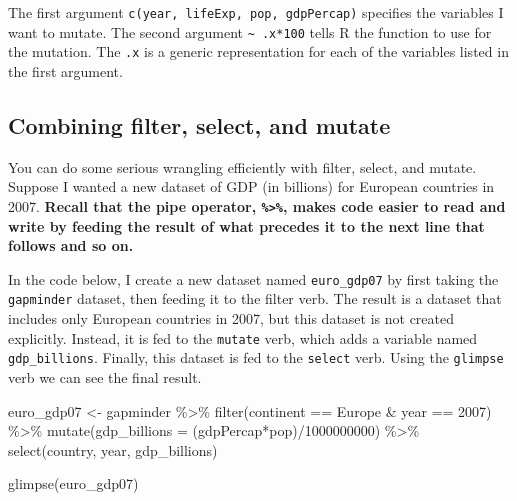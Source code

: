 \documentclass[
]{book}
\makeatletter
\newenvironment{Shaded}{\begin{snugshade}}{\end{snugshade}}
\newcommand{\AttributeTok}[1]{\textcolor[rgb]{0.61,0.61,0.61}{#1}}
\newcommand{\DecValTok}[1]{\textcolor[rgb]{0.06,0.06,0.06}{#1}}
\newcommand{\FunctionTok}[1]{\textcolor[rgb]{0,0,0}{#1}}
\newcommand{\NormalTok}[1]{#1}
\newcommand{\OtherTok}[1]{\textcolor[rgb]{0.37,0.37,0.37}{#1}}
\newcommand{\SpecialCharTok}[1]{\textcolor[rgb]{0,0,0}{#1}}
\newcommand{\StringTok}[1]{\textcolor[rgb]{0.5,0.5,0.5}{#1}}
\newenvironment{kframe}{%
\medskip{}
\setlength{\fboxsep}{.8em}
 \def\at@end@of@kframe{}%
 \ifinner\ifhmode%
  \def\at@end@of@kframe{\end{minipage}}%
  \begin{minipage}{\columnwidth}%
 \fi\fi%
 \def\FrameCommand##1{\hskip\@totalleftmargin \hskip-\fboxsep
 \colorbox{shadecolor}{##1}\hskip-\fboxsep
     \hskip-\linewidth \hskip-\@totalleftmargin \hskip\columnwidth}%
 \MakeFramed {\advance\hsize-\width
   \@totalleftmargin\z@ \linewidth\hsize
   \@setminipage}}%
 {\par\unskip\endMakeFramed%
 \at@end@of@kframe}
\renewenvironment{Shaded}{\begin{kframe}}{\end{kframe}}
\makeatother
\begin{document}
The first argument \texttt{c(year,\ lifeExp,\ pop,\ gdpPercap)} specifies the variables I want to mutate. The second argument \texttt{\textasciitilde{}\ .x*100} tells R the function to use for the mutation. The \texttt{.x} is a generic representation for each of the variables listed in the first argument.

\hypertarget{combining-filter-select-and-mutate}{%
\subsection{Combining filter, select, and mutate}\label{combining-filter-select-and-mutate}}

You can do some serious wrangling efficiently with filter, select, and mutate. Suppose I wanted a new dataset of GDP (in billions) for European countries in 2007. \textbf{Recall that the pipe operator, \texttt{\%\textgreater{}\%}, makes code easier to read and write by feeding the result of what precedes it to the next line that follows and so on.}

In the code below, I create a new dataset named \texttt{euro\_gdp07} by first taking the \texttt{gapminder} dataset, then feeding it to the filter verb. The result is a dataset that includes only European countries in 2007, but this dataset is not created explicitly. Instead, it is fed to the \texttt{mutate} verb, which adds a variable named \texttt{gdp\_billions}. Finally, this dataset is fed to the \texttt{select} verb. Using the \texttt{glimpse} verb we can see the final result.

\begin{Shaded}
\begin{Highlighting}[]
\NormalTok{euro\_gdp07 }\OtherTok{\textless{}{-}}\NormalTok{ gapminder }\SpecialCharTok{\%\textgreater{}\%} 
  \FunctionTok{filter}\NormalTok{(continent }\SpecialCharTok{==} \StringTok{\textquotesingle{}Europe\textquotesingle{}} \SpecialCharTok{\&}\NormalTok{ year }\SpecialCharTok{==} \DecValTok{2007}\NormalTok{) }\SpecialCharTok{\%\textgreater{}\%} 
  \FunctionTok{mutate}\NormalTok{(}\AttributeTok{gdp\_billions =}\NormalTok{ (gdpPercap}\SpecialCharTok{*}\NormalTok{pop)}\SpecialCharTok{/}\DecValTok{1000000000}\NormalTok{) }\SpecialCharTok{\%\textgreater{}\%} 
  \FunctionTok{select}\NormalTok{(country, year, gdp\_billions)}

\FunctionTok{glimpse}\NormalTok{(euro\_gdp07)}
\end{Highlighting}
\end{Shaded}
\end{document}

